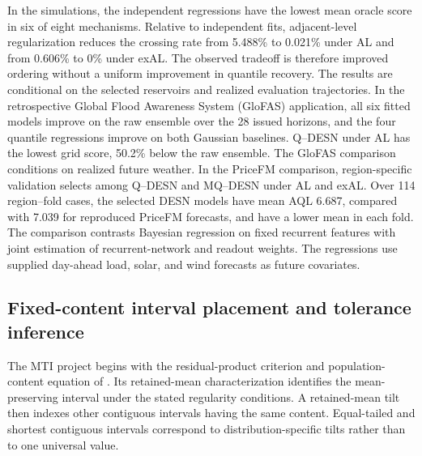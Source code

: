 In the simulations, the independent regressions have the lowest mean oracle
score in six of eight mechanisms. Relative to independent fits, adjacent-level
regularization reduces the crossing rate from 5.488\% to 0.021\% under AL and
from 0.606\% to 0\% under exAL. The observed tradeoff is therefore improved
ordering without a uniform improvement in quantile recovery. The results are
conditional on the selected reservoirs and realized evaluation trajectories.
In the retrospective Global Flood Awareness System (GloFAS) application, all
six fitted models improve on the raw ensemble over the 28 issued horizons, and
the four quantile regressions improve on both Gaussian baselines. Q--DESN under
AL has the lowest grid score, 50.2\% below the raw ensemble. The GloFAS comparison
conditions on realized future weather.
In the PriceFM comparison, region-specific validation selects among Q--DESN
and MQ--DESN under AL and exAL. Over 114 region--fold cases, the selected DESN
models have mean AQL 6.687, compared with 7.039 for
reproduced PriceFM forecasts, and have a lower mean in each fold. The comparison
contrasts Bayesian regression on fixed recurrent features with joint estimation
of recurrent-network and readout weights. The regressions use supplied day-ahead load,
solar, and wind forecasts as future covariates.

\subsection{Fixed-content interval placement and tolerance inference}

The MTI project begins with the residual-product criterion and population-content
equation of \citet{rqr-PouplinEtAl2024RQR}. Its retained-mean characterization
identifies the mean-preserving interval under the stated regularity conditions.
A retained-mean tilt then indexes other contiguous intervals having the same
content. Equal-tailed and shortest contiguous intervals correspond to
distribution-specific tilts rather than to one universal value.

